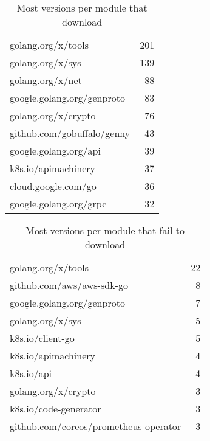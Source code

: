 \begin{table}[ht]
\caption{Most versions per module that  download}
\label{table:versions}
\begin{tabular}{|l|r|}
\hline
 golang.org/x/tools & 201 \\
 golang.org/x/sys & 139 \\
 golang.org/x/net & 88 \\
 google.golang.org/genproto & 83 \\
 golang.org/x/crypto & 76 \\
 github.com/gobuffalo/genny & 43 \\
 google.golang.org/api & 39 \\
 k8s.io/apimachinery & 37 \\
 cloud.google.com/go & 36 \\
 google.golang.org/grpc & 32 \\
\hline
\end{tabular}
\end{table}
\begin{table}[ht]
\caption{Most versions per module that fail to download}
\label{table:failversions}
\begin{tabular}{|l|r|}
\hline
 golang.org/x/tools & 22 \\
 github.com/aws/aws-sdk-go & 8 \\
 google.golang.org/genproto & 7 \\
 golang.org/x/sys & 5 \\
 k8s.io/client-go & 5 \\
 k8s.io/apimachinery & 4 \\
 k8s.io/api & 4 \\
 golang.org/x/crypto & 3 \\
 k8s.io/code-generator & 3 \\
 github.com/coreos/prometheus-operator & 3 \\
\hline
\end{tabular}
\end{table}
